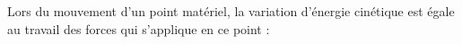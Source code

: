 ﻿\documentclass[a4paper]{article}
\begin{document}
\pagestyle{fancy}
\fancyhf{}
\setlength{\headheight}{15pt}

\begin{center}
	\large{}
\end{center}


Lors du mouvement d'un point matériel, la variation d'énergie cinétique est égale au travail des forces qui s'applique en ce point :\\
\begin{center}
\end{center}
\end{document}
